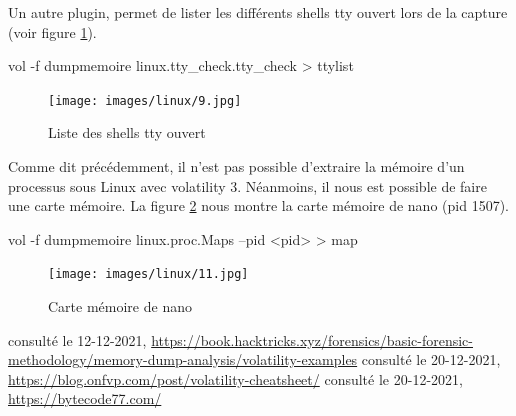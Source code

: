 \documentclass[a4paper]{article}
\begin{document}
Un autre plugin, permet de lister les différents shells tty ouvert lors de la capture (voir figure \ref{fig:tty}).

\begin{example}
    vol -f dumpmemoire linux.tty\_check.tty\_check > ttylist
\end{example}

\begin{figure}[H]
    \centering
    \texttt{[image: images/linux/9.jpg]}
    \caption{Liste des shells tty ouvert}
    \label{fig:tty}
\end{figure}

Comme dit précédemment, il n'est pas possible d'extraire la mémoire d'un processus sous Linux avec volatility 3. Néanmoins, il nous est possible de faire une carte mémoire. La figure \ref{fig:mapnano} nous montre la carte mémoire de nano (pid 1507).

\begin{example}
    vol -f dumpmemoire linux.proc.Maps --pid <pid> > map
\end{example}

\begin{figure}[H]
    \centering
    \texttt{[image: images/linux/11.jpg]}
    \caption{Carte mémoire de nano}
    \label{fig:mapnano}
\end{figure}














\newpage {} \listoffigures
\newpage {}
\begin{thebibliography}{9}
 consulté le 12-12-2021, {\footnotesize \url{https://book.hacktricks.xyz/forensics/basic-forensic-methodology/memory-dump-analysis/volatility-examples}}
 consulté le 20-12-2021, {\footnotesize \url{https://blog.onfvp.com/post/volatility-cheatsheet/}}
 consulté le 20-12-2021, {\footnotesize \url{https://bytecode77.com/}}
\end{thebibliography}
\end{document}

